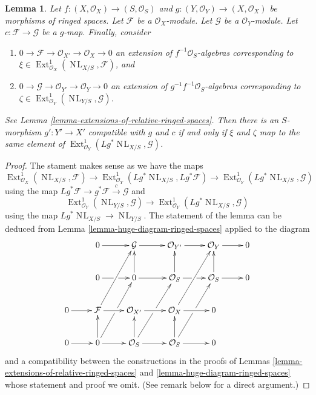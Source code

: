 \documentclass{stacks-project}
\theoremstyle{plain}
\newtheorem{lemma}[subsection]{Lemma}
\theoremstyle{definition}
\theoremstyle{remark}
\numberwithin{equation}{subsection}
\def\Ext{\mathop{\mathrm{Ext}}\nolimits}
\def\NL{\mathop{N\!L}\nolimits}
\begin{document}
\begin{lemma}
\label{lemma-extensions-of-relative-ringed-spaces-functorial}
Let $f : (X, \mathcal{O}_X) \to (S, \mathcal{O}_S)$ and
$g : (Y, \mathcal{O}_Y) \to (X, \mathcal{O}_X)$ be morphisms
of ringed spaces. Let $\mathcal{F}$ be a $\mathcal{O}_X$-module.
Let $\mathcal{G}$ be a $\mathcal{O}_Y$-module. Let
$c : \mathcal{F} \to \mathcal{G}$ be a $g$-map. Finally, consider
\begin{enumerate}
\item[(a)] $0 \to \mathcal{F} \to \mathcal{O}_{X'} \to \mathcal{O}_X \to 0$
an extension of $f^{-1}\mathcal{O}_S$-algebras
corresponding to $\xi \in \Ext^1_{\mathcal{O}_X}(\NL_{X/S}, \mathcal{F})$, and
\item[(b)] $0 \to \mathcal{G} \to \mathcal{O}_{Y'} \to \mathcal{O}_Y \to 0$
an extension of $g^{-1}f^{-1}\mathcal{O}_S$-algebras
corresponding to $\zeta \in \Ext^1_{\mathcal{O}_Y}(\NL_{Y/S}, \mathcal{G})$.
\end{enumerate}
See Lemma \ref{lemma-extensions-of-relative-ringed-spaces}.
Then there is an $S$-morphism $g' : Y' \to X'$
compatible with $g$ and $c$ if and only if $\xi$ and $\zeta$
map to the same element of
$\Ext^1_{\mathcal{O}_Y}(Lg^*\NL_{X/S}, \mathcal{G})$.
\end{lemma}

\begin{proof}
The stament makes sense as we have the maps
$$
\Ext^1_{\mathcal{O}_X}(\NL_{X/S}, \mathcal{F}) \to
\Ext^1_{\mathcal{O}_Y}(Lg^*\NL_{X/S}, Lg^*\mathcal{F}) \to
\Ext^1_{\mathcal{O}_Y}(Lg^*\NL_{X/S}, \mathcal{G})
$$
using the map $Lg^*\mathcal{F} \to g^*\mathcal{F} \xrightarrow{c} \mathcal{G}$
and
$$
\Ext^1_{\mathcal{O}_Y}(\NL_{Y/S}, \mathcal{G}) \to
\Ext^1_{\mathcal{O}_Y}(Lg^*\NL_{X/S}, \mathcal{G})
$$
using the map $Lg^*\NL_{X/S} \to \NL_{Y/S}$.
The statement of the lemma can be deduced from
Lemma \ref{lemma-huge-diagram-ringed-spaces} applied to the diagram
$$
\xymatrix{
& 0 \ar[r] &
\mathcal{G} \ar[r] &
\mathcal{O}_{Y'} \ar[r] &
\mathcal{O}_Y \ar[r] & 0 \\
& 0 \ar[r]|\hole & 0 \ar[u] \ar[r] &
\mathcal{O}_S \ar[u] \ar[r]|\hole &
\mathcal{O}_S \ar[u] \ar[r] & 0 \\
0 \ar[r] &
\mathcal{F} \ar[ruu] \ar[r] &
\mathcal{O}_{X'} \ar[r] &
\mathcal{O}_X \ar[ruu] \ar[r] & 0 \\
0 \ar[r] & 0 \ar[ruu]|\hole \ar[u] \ar[r] &
\mathcal{O}_S \ar[ruu]|\hole \ar[u] \ar[r] &
\mathcal{O}_S \ar[ruu]|\hole \ar[u] \ar[r] & 0
}
$$
and a compatibility between the constructions in the proofs
of Lemmas \ref{lemma-extensions-of-relative-ringed-spaces} and
\ref{lemma-huge-diagram-ringed-spaces}
whose statement and proof we omit. (See remark below for a direct argument.)
\end{proof}
\end{document}
